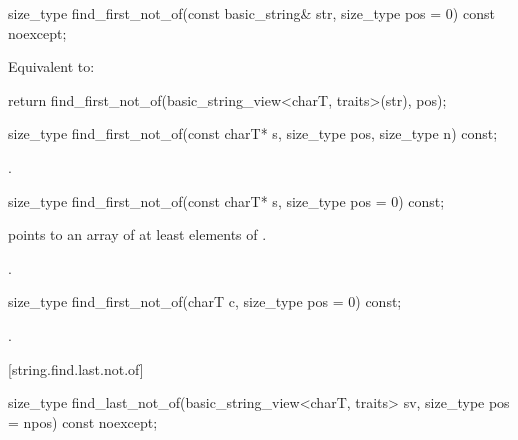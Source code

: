 %
\begin{itemdecl}
size_type find_first_not_of(const basic_string& str, size_type pos = 0) const noexcept;
\end{itemdecl}

\begin{itemdescr}
\pnum
\effects
Equivalent to:
\begin{codeblock}
return find_first_not_of(basic_string_view<charT, traits>(str), pos);
\end{codeblock}
\end{itemdescr}

%
\begin{itemdecl}
size_type find_first_not_of(const charT* s, size_type pos, size_type n) const;
\end{itemdecl}

\begin{itemdescr}
\pnum
\returns
{}.
\end{itemdescr}

%
\begin{itemdecl}
size_type find_first_not_of(const charT* s, size_type pos = 0) const;
\end{itemdecl}

\begin{itemdescr}
\pnum
\requires {} points to an array of at least 
elements of .

\pnum
\returns
{}.
\end{itemdescr}

%
\begin{itemdecl}
size_type find_first_not_of(charT c, size_type pos = 0) const;
\end{itemdecl}

\begin{itemdescr}
\pnum
\returns
{}.
\end{itemdescr}

[string.find.last.not.of]{}

%
\begin{itemdecl}
size_type find_last_not_of(basic_string_view<charT, traits> sv,
                           size_type pos = npos) const noexcept;
\end{itemdecl}

